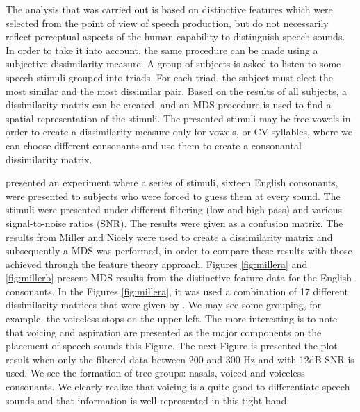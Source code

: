 The analysis that was carried out is based on distinctive features which were selected from the point of view of speech production, but do not necessarily reflect perceptual aspects of the human capability to distinguish speech sounds. In order to take it into account, the same procedure can be made using a subjective dissimilarity measure. A group of subjects is asked to listen to some speech stimuli grouped into triads. For each triad, the subject must elect the most similar and the most dissimilar pair. Based on the results of all subjects, a dissimilarity matrix can be created, and an MDS procedure is used to find a spatial representation of the stimuli. The presented stimuli may be free vowels in order to create a dissimilarity measure only for vowels, or CV syllables, where we can choose different consonants and use them to create a consonantal dissimilarity matrix.

\cite{miller1955} presented an experiment where a series of stimuli, sixteen English consonants, were presented to subjects who were forced to guess them at every sound. The stimuli were presented under different filtering (low and high pass) and various signal-to-noise ratios (SNR). The results were given as a confusion matrix. The results from Miller and Nicely were used to create a dissimilarity matrix and subsequently a MDS was performed, in order to compare these results with those achieved through the feature theory approach. Figures \ref{fig:millera} and \ref{fig:millerb} present MDS results from the distinctive feature data for the English consonants. 
In the Figures \ref{fig:millera}, it was used a combination of 17 different dissimilarity matrices that were given by \cite{miller1955}. We may see some grouping, for example, the voiceless stops on the upper left. The more interesting is to note that voicing and aspiration are presented as the major components on the placement of speech sounds this Figure. 
The next Figure is presented the plot result when only the filtered data between 200 and 300 Hz and with 12dB SNR is used. We see the formation of tree groups: nasals, voiced and voiceless consonants. We clearly realize that voicing is a quite good to differentiate speech sounds and that information is well represented in this tight band.

